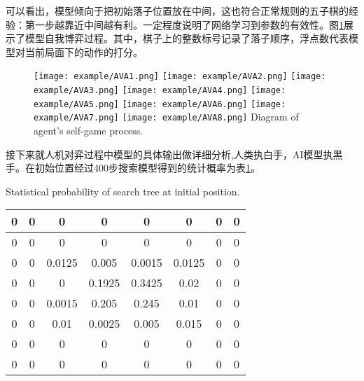 可以看出，模型倾向于把初始落子位置放在中间，这也符合正常规则的五子棋的经验：第一步越靠近中间越有利。一定程度说明了网络学习到参数的有效性。图\ref{figAIvsAI}展示了模型自我博弈过程。其中，棋子上的整数标号记录了落子顺序，浮点数代表模型对当前局面下的动作的打分。

\begin{figure}[htpb]
	\centering
	\texttt{[image: example/AVA1.png]}
	\hspace{0.5cm}
	\texttt{[image: example/AVA2.png]}
	\hspace{0.5cm}
	\texttt{[image: example/AVA3.png]}
	\hspace{0.5cm}
	\texttt{[image: example/AVA4.png]}
	\hspace{0.5cm}
	\texttt{[image: example/AVA5.png]}
	\hspace{0.5cm}
	\texttt{[image: example/AVA6.png]}
	\hspace{0.5cm}
	\texttt{[image: example/AVA7.png]}
	\hspace{0.5cm}
	\texttt{[image: example/AVA8.png]}
	{Diagram of agent's self-game process.}
	\label{figAIvsAI}
\end{figure}

接下来就人机对弈过程中模型的具体输出做详细分析,人类执白手，AI模型执黑手。在初始位置经过400步搜索模型得到的统计概率为表\ref{tab:moxinggailv2}。
\begin{table}[htbp]
	\centering
	{Statistical probability of search tree at initial position.}
	\label{tab:moxinggailv2}
\begin{tabular}{|c|c|c|c|c|c|c|c|}
	\hline 
	0& 0 & 0 & 0 & 0 & 0 &  0&  0\\ 
	\hline 
	0& 0 & 0 & 0 & 0 & 0 &  0&  0\\ 
	\hline 
	0 & 0 & 0.0125 & 0.005 & 0.0015 & 0.0125 & 0 & 0 \\ 
	\hline 
	0 & 0 & 0 & 0.1925 & 0.3425 & 0.02 & 0 & 0 \\ 
	\hline 
	0 & 0 & 0.0015 & 0.205 & 0.245 & 0.01 & 0 & 0 \\ 
	\hline 
	0 & 0 & 0.01 & 0.0025 & 0.005 & 0.015 & 0 & 0 \\ 
	\hline 
	0 & 0 & 0 & 0 & 0 & 0 & 0 & 0 \\ 
	\hline 
	0 & 0 & 0 & 0 & 0 & 0 & 0 & 0 \\  
	\hline 
\end{tabular} 
\end{table}

